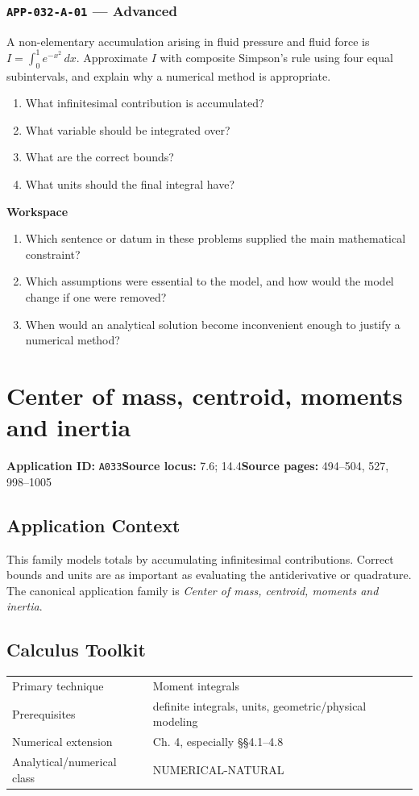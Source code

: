 \documentclass[11pt]{book}
\newcommand{\pid}[1]{\texttt{#1}}
\newcommand{\workspace}{\par\vspace{0.7in}\hrulefill\par\vspace{0.55in}\hrulefill\par}
\begin{document}
\subsection*{\pid{APP-032-A-01} — Advanced}
\begin{problembox}
A non-elementary accumulation arising in fluid pressure and fluid force is $I=\int_0^1 e^{-x^2}\,dx$. Approximate $I$ with composite Simpson's rule using four equal subintervals, and explain why a numerical method is appropriate.
\end{problembox}
\begin{promptbox}\begin{enumerate}
\item What infinitesimal contribution is accumulated?
\item What variable should be integrated over?
\item What are the correct bounds?
\item What units should the final integral have?
\end{enumerate}\end{promptbox}
\textbf{Workspace}\workspace
\begin{reflectionbox}\begin{enumerate}
\item Which sentence or datum in these problems supplied the main mathematical constraint?
\item Which assumptions were essential to the model, and how would the model change if one were removed?
\item When would an analytical solution become inconvenient enough to justify a numerical method?
\end{enumerate}\end{reflectionbox}
\chapter{Center of mass, centroid, moments and inertia}\label{app:A033}
\textbf{Application ID:} \pid{A033}\quad \textbf{Source locus:} 7.6; 14.4\quad \textbf{Source pages:} 494–504, 527, 998–1005
\section*{Application Context}
This family models totals by accumulating infinitesimal contributions. Correct bounds and units are as important as evaluating the antiderivative or quadrature. The canonical application family is \emph{Center of mass, centroid, moments and inertia}.
\section*{Calculus Toolkit}
\begin{tabularx}{\textwidth}{@{}lX@{}}\toprule
Primary technique & Moment integrals \\
Prerequisites & definite integrals, units, geometric/physical modeling \\
Numerical extension & Ch. 4, especially §§4.1–4.8 \\
Analytical/numerical class & NUMERICAL-NATURAL \\
\bottomrule\end{tabularx}
\end{document}
